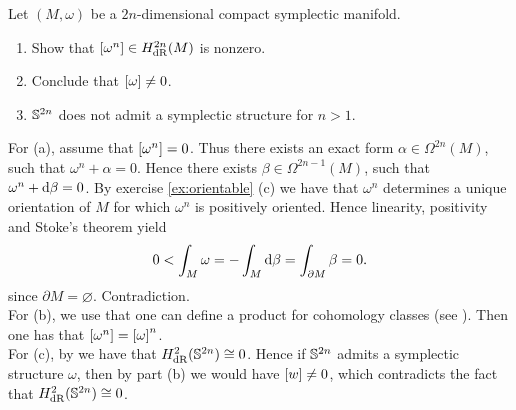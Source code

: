 \begin{exercise}
Let $(M,\omega)$ be a $2n$-dimensional compact symplectic manifold. 
\begin{enumerate}[label = \textup{(}\alph*\textup{)}]
\item Show that $\sbr[0]{\omega^n} \in H_{\dRrm}^{2n}(M)$ is nonzero.
\item Conclude that $\sbr[0]{\omega} \neq 0$.
\item $\mathbb{S}^{2n}$ does not admit a symplectic structure for $n > 1$.
\end{enumerate}
\end{exercise}

\begin{solution}
For (a), assume that $\sbr[0]{\omega^n} = 0$. Thus there exists an exact form $\alpha \in \Omega^{2n}(M)$, such that $\omega^n + \alpha = 0$. Hence there exists $\beta \in \Omega^{2n - 1}(M)$, such that $\omega^n + \mathop{}\!\mathrm{d} \beta = 0$. By exercise \ref{ex:orientable} (c) we have that $\omega^n$ determines a unique orientation of $M$ for which $\omega^n$ is positively oriented. Hence linearity, positivity and Stoke's theorem \cite[407,411]{lee:smooth_manifolds:2013} yield
\begin{equation*}
0 < \int_M \omega = - \int_M \mathop{}\!\mathrm{d} \beta = \int_{\partial M} \beta = 0.
\end{equation*} 
\noindent since $\partial M = \varnothing$. Contradiction.\\
For (b), we use that one can define a product for cohomology classes (see \cite[464]{lee:smooth_manifolds:2013}). Then one has that $\sbr[0]{\omega^n} = \sbr[0]{\omega}^n$.\\
For (c), by \cite[450]{lee:smooth_manifolds:2013} we have that $H_{\mathrm{dR}}^2(\mathbb{S}^{2n}) \cong 0$. Hence if $\mathbb{S}^{2n}$ admits a symplectic structure $\omega$, then by part (b) we would have $\sbr[0]{w} \neq 0$, which contradicts the fact that $H_{\mathrm{dR}}^2(\mathbb{S}^{2n}) \cong 0$.
\end{solution}